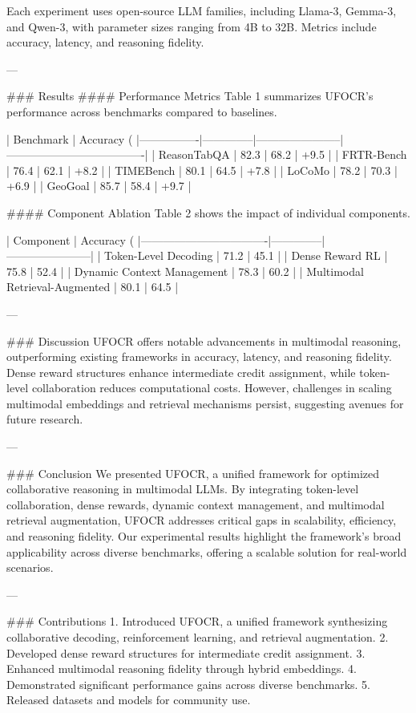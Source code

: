 Each experiment uses open-source LLM families, including Llama-3, Gemma-3, and Qwen-3, with parameter sizes ranging from 4B to 32B. Metrics include accuracy, latency, and reasoning fidelity.

---

### Results
#### Performance Metrics
Table 1 summarizes UFOCR's performance across benchmarks compared to baselines.

| Benchmark      | Accuracy (%
|----------------|--------------|-----------------------|-------------------------------------|
| ReasonTabQA    | 82.3         | 68.2                 | +9.5                               |
| FRTR-Bench     | 76.4         | 62.1                 | +8.2                               |
| TIMEBench      | 80.1         | 64.5                 | +7.8                               |
| LoCoMo         | 78.2         | 70.3                 | +6.9                               |
| GeoGoal        | 85.7         | 58.4                 | +9.7                               |

#### Component Ablation
Table 2 shows the impact of individual components.

| Component                        | Accuracy (%
|----------------------------------|--------------|-----------------------|
| Token-Level Decoding             | 71.2         | 45.1                 |
| Dense Reward RL                  | 75.8         | 52.4                 |
| Dynamic Context Management       | 78.3         | 60.2                 |
| Multimodal Retrieval-Augmented   | 80.1         | 64.5                 |

---

### Discussion
UFOCR offers notable advancements in multimodal reasoning, outperforming existing frameworks in accuracy, latency, and reasoning fidelity. Dense reward structures enhance intermediate credit assignment, while token-level collaboration reduces computational costs. However, challenges in scaling multimodal embeddings and retrieval mechanisms persist, suggesting avenues for future research.

---

### Conclusion
We presented UFOCR, a unified framework for optimized collaborative reasoning in multimodal LLMs. By integrating token-level collaboration, dense rewards, dynamic context management, and multimodal retrieval augmentation, UFOCR addresses critical gaps in scalability, efficiency, and reasoning fidelity. Our experimental results highlight the framework's broad applicability across diverse benchmarks, offering a scalable solution for real-world scenarios.

---

### Contributions
1. Introduced UFOCR, a unified framework synthesizing collaborative decoding, reinforcement learning, and retrieval augmentation.
2. Developed dense reward structures for intermediate credit assignment.
3. Enhanced multimodal reasoning fidelity through hybrid embeddings.
4. Demonstrated significant performance gains across diverse benchmarks.
5. Released datasets and models for community use.

